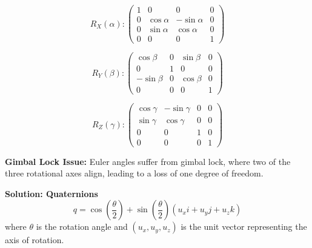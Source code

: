 \begin{minipage}[t]{0.33\textwidth}
    \[
    R_X(\alpha):\begin{pmatrix}
    1 & 0 & 0 & 0 \\
    0 & \cos\alpha & -\sin\alpha & 0 \\
    0 & \sin\alpha & \cos\alpha & 0 \\
    0 & 0 & 0 & 1
    \end{pmatrix}
    \]
\end{minipage}%
\begin{minipage}[t]{0.33\textwidth}
    \[
    R_Y(\beta):\begin{pmatrix}
    \cos\beta & 0 & \sin\beta & 0 \\
    0 & 1 & 0 & 0 \\
    -\sin\beta & 0 & \cos\beta & 0 \\
    0 & 0 & 0 & 1
    \end{pmatrix}
    \]
\end{minipage}%
\begin{minipage}[t]{0.33\textwidth}
    \[
    R_Z(\gamma):\begin{pmatrix}
    \cos\gamma & -\sin\gamma & 0 & 0 \\
    \sin\gamma & \cos\gamma & 0 & 0 \\
    0 & 0 & 1 & 0 \\
    0 & 0 & 0 & 1
    \end{pmatrix}
    \]
\end{minipage}


\textbf{Gimbal Lock Issue:} Euler angles suffer from gimbal lock, where two of the three rotational axes align, leading to a loss of one degree of freedom.

\textbf{Solution: Quaternions}
\begin{equation}
    q = \cos\left(\frac{\theta}{2}\right) + \sin\left(\frac{\theta}{2}\right)(u_x i + u_y j + u_z k)
\end{equation}
where \( \theta \) is the rotation angle and \( (u_x, u_y, u_z) \) is the unit vector representing the axis of rotation.












